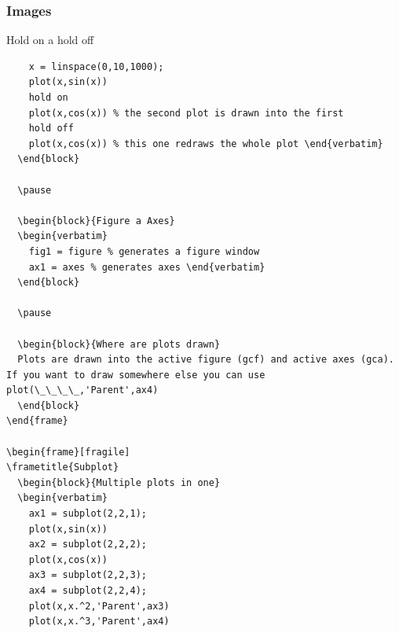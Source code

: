 \documentclass{beamer}
\begin{document}
\begin{frame}[fragile]
\frametitle{Images}
  \begin{block}{Hold on a hold off}
  \begin{verbatim}
    x = linspace(0,10,1000);    
    plot(x,sin(x))
    hold on
    plot(x,cos(x)) % the second plot is drawn into the first
    hold off 
    plot(x,cos(x)) % this one redraws the whole plot \end{verbatim}
  \end{block}
  
  \pause
  
  \begin{block}{Figure a Axes}
  \begin{verbatim}
    fig1 = figure % generates a figure window
    ax1 = axes % generates axes \end{verbatim}
  \end{block}
  
  \pause
  
  \begin{block}{Where are plots drawn}
  Plots are drawn into the active figure (gcf) and active axes (gca). If you want to draw somewhere else you can use plot(\_\_\_\_,'Parent',ax4)
  \end{block}
\end{frame}

\begin{frame}[fragile]
\frametitle{Subplot}
  \begin{block}{Multiple plots in one}
  \begin{verbatim}
    ax1 = subplot(2,2,1);
    plot(x,sin(x))       
    ax2 = subplot(2,2,2);
    plot(x,cos(x))
    ax3 = subplot(2,2,3);
    ax4 = subplot(2,2,4);
    plot(x,x.^2,'Parent',ax3)
    plot(x,x.^3,'Parent',ax4) \end{verbatim}
  \end{block}
\end{frame}
\end{document}
